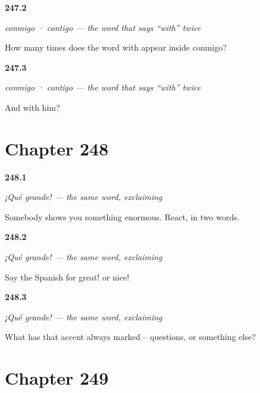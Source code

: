 \noindent\begin{minipage}[t]{\linewidth}
\raggedright
\hypertarget{review-ES-C64-conmigo-twice}{\textbf{247.2}} \emph{conmigo · contigo — the word that says \textquotedblleft{}with\textquotedblright{} twice}\par
\small How many times does the word with appear inside conmigo?
\end{minipage}\par\medskip

\noindent\begin{minipage}[t]{\linewidth}
\raggedright
\hypertarget{review-ES-C64-conmigo-third}{\textbf{247.3}} \emph{conmigo · contigo — the word that says \textquotedblleft{}with\textquotedblright{} twice}\par
\small And with him?
\end{minipage}\par\medskip

\section*{Chapter 248}

\noindent\begin{minipage}[t]{\linewidth}
\raggedright
\hypertarget{review-ES-C64-que-grande-say}{\textbf{248.1}} \emph{¡Qué grande! — the same word, exclaiming}\par
\small Somebody shows you something enormous. React, in two words.
\end{minipage}\par\medskip

\noindent\begin{minipage}[t]{\linewidth}
\raggedright
\hypertarget{review-ES-C64-que-grande-good}{\textbf{248.2}} \emph{¡Qué grande! — the same word, exclaiming}\par
\small Say the Spanish for great! or nice!
\end{minipage}\par\medskip

\noindent\begin{minipage}[t]{\linewidth}
\raggedright
\hypertarget{review-ES-C64-que-grande-accent}{\textbf{248.3}} \emph{¡Qué grande! — the same word, exclaiming}\par
\small What has that accent always marked -- questions, or something else?
\end{minipage}\par\medskip

\section*{Chapter 249}

